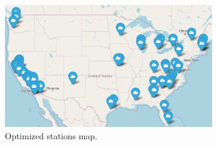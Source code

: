 \begin{figure}[h!]
    \centering
    \includegraphics[width=0.8\textwidth]{../Figures/optimized_map.PNG}
    \caption{Optimized stations map.}
    \label{fig:optimized_map}
\end{figure}

\vspace{1cm}


